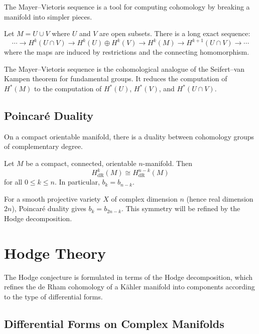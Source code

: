 The Mayer--Vietoris sequence is a tool for computing cohomology by breaking a manifold into simpler pieces.

\begin{theorem}
Let $M = U \cup V$ where $U$ and $V$ are open subsets. There is a long exact sequence:
\[
\cdots \to H^k(U \cap V) \to H^k(U) \oplus H^k(V) \to H^k(M) \to H^{k+1}(U \cap V) \to \cdots
\]
where the maps are induced by restrictions and the connecting homomorphism.
\end{theorem}

\begin{remark}
The Mayer--Vietoris sequence is the cohomological analogue of the Seifert--van Kampen theorem for fundamental groups. It reduces the computation of $H^*(M)$ to the computation of $H^*(U)$, $H^*(V)$, and $H^*(U \cap V)$.
\end{remark}

\subsection{Poincar\'{e} Duality}

On a compact orientable manifold, there is a duality between cohomology groups of complementary degree.

\begin{theorem}
Let $M$ be a compact, connected, orientable $n$-manifold. Then
\[
H^k_{\text{dR}}(M) \cong H^{n-k}_{\text{dR}}(M)
\]
for all $0 \le k \le n$. In particular, $b_k = b_{n-k}$.
\end{theorem}

For a smooth projective variety $X$ of complex dimension $n$ (hence real dimension $2n$), Poincar\'{e} duality gives $b_k = b_{2n-k}$. This symmetry will be refined by the Hodge decomposition.

\section{Hodge Theory}

The Hodge conjecture is formulated in terms of the Hodge decomposition, which refines the de Rham cohomology of a K\"{a}hler manifold into components according to the type of differential forms.

\subsection{Differential Forms on Complex Manifolds}

